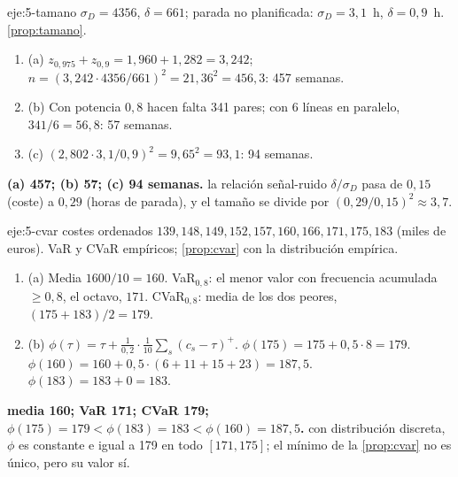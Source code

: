 \begin{solucion}{eje:5-tamano}
\datos $\sigma_D=4356$, $\delta=661$; parada no planificada: $\sigma_D=3{,}1$~h, $\delta=0{,}9$~h.
\planteamiento \cref{prop:tamano}.
\pasos
\begin{enumerate}[label=\arabic*.]
  \item (a) $z_{0{,}975}+z_{0{,}9}=1{,}960+1{,}282=3{,}242$; $n=(3{,}242\cdot4356/661)^{2}=21{,}36^{2}=456{,}3$: 457 semanas.
  \item (b) Con potencia $0{,}8$ hacen falta 341 pares; con 6 líneas en paralelo, $341/6=56{,}8$: 57 semanas.
  \item (c) $(2{,}802\cdot3{,}1/0{,}9)^{2}=9{,}65^{2}=93{,}1$: 94 semanas.
\end{enumerate}
\resultado \textbf{(a) 457; (b) 57; (c) 94 semanas.}
\comprobacion la relación señal-ruido $\delta/\sigma_D$ pasa de $0{,}15$ (coste) a $0{,}29$ (horas de parada), y el tamaño se divide por $(0{,}29/0{,}15)^{2}\approx3{,}7$.
\end{solucion}

\begin{solucion}{eje:5-cvar}
\datos costes ordenados $139,148,149,152,157,160,166,171,175,183$ (miles de euros).
\planteamiento VaR y CVaR empíricos; \cref{prop:cvar} con la distribución empírica.
\pasos
\begin{enumerate}[label=\arabic*.]
  \item (a) Media $1600/10=160$. VaR$_{0{,}8}$: el menor valor con frecuencia acumulada $\ge0{,}8$, el octavo, $171$. CVaR$_{0{,}8}$: media de los dos peores, $(175+183)/2=179$.
  \item (b) $\phi(\tau)=\tau+\frac{1}{0{,}2}\cdot\frac{1}{10}\sum_s(c_s-\tau)^{+}$. $\phi(175)=175+0{,}5\cdot8=179$. $\phi(160)=160+0{,}5\cdot(6+11+15+23)=187{,}5$. $\phi(183)=183+0=183$.
\end{enumerate}
\resultado \textbf{media 160; VaR 171; CVaR 179; $\phi(175)=179<\phi(183)=183<\phi(160)=187{,}5$.}
\comprobacion con distribución discreta, $\phi$ es constante e igual a 179 en todo $[171,175]$; el mínimo de la \cref{prop:cvar} no es único, pero su valor sí.
\end{solucion}

